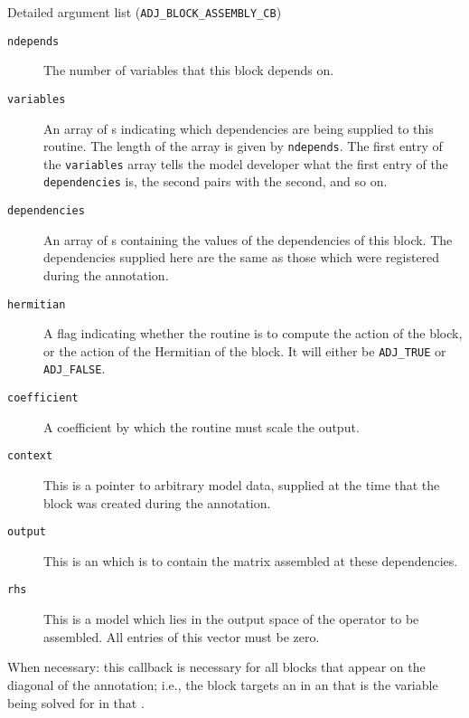 \begin{boxwithtitle}{Detailed argument list (\texttt{ADJ_BLOCK_ASSEMBLY_CB})}
\begin{description}
\item[\texttt{ndepends}] The number of variables that this block depends on.
\item[\texttt{variables}] An array of s indicating which dependencies are being supplied to this routine. The length of the
array is given by \texttt{ndepends}. The first entry of the \texttt{variables} array
tells the model developer what the first entry of the \texttt{dependencies} is, the second pairs with the second, and so on.
\item[\texttt{dependencies}] An array of s containing the values of the dependencies of this block. The dependencies supplied
here are the same as those which were registered during the annotation.
\item[\texttt{hermitian}] A flag indicating whether the routine is to compute the action of the block, or the action of the Hermitian of the
block. It will either be \texttt{ADJ_TRUE} or \texttt{ADJ_FALSE}.
\item[\texttt{coefficient}] A coefficient by which the routine must scale the output.
\item[\texttt{context}] This is a pointer to arbitrary model data, supplied at the time that the block was created during the annotation.
\item[\texttt{output}] This is an  which is to contain the matrix assembled at these dependencies.
\item[\texttt{rhs}] This is a model  which lies in the output space of the operator to be assembled. All entries of this vector must be zero.
\end{description}
\end{boxwithtitle}

When necessary: this callback is necessary for all blocks that appear on the diagonal of the annotation; i.e., the block
targets an  in an  that is the variable being solved for in that
.

